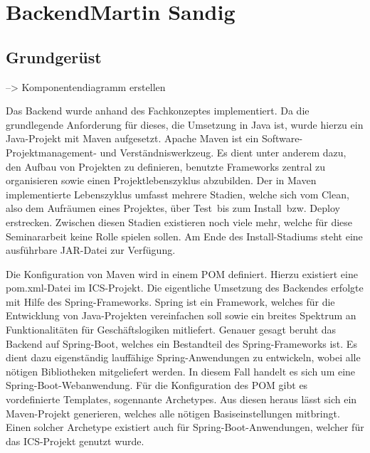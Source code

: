 	\section[Backend]{Backend{\hfill \normalsize Martin Sandig}}
\subsection{Grundgerüst}\label{umsetzung:backend:grundgeruest}
--> Komponentendiagramm erstellen



Das Backend wurde anhand des Fachkonzeptes implementiert. Da die grundlegende Anforderung für dieses, die Umsetzung in Java ist, wurde hierzu ein Java-Projekt mit Maven aufgesetzt. Apache Maven ist ein Software-Projektmanagement- und Verständniswerkzeug.\autocite{ApacheSoftwareFoundation} Es dient unter anderem dazu, den Aufbau von Projekten zu definieren, benutzte Frameworks zentral zu organisieren sowie einen Projektlebenszyklus abzubilden. Der in Maven implementierte Lebenszyklus umfasst mehrere Stadien, welche sich vom \glqq Clean\grqq, also dem Aufräumen eines Projektes, über \glqq Test\grqq \, bis zum \glqq Install\grqq \, bzw. \glqq Deploy\grqq \, erstrecken. Zwischen diesen Stadien existieren noch viele mehr, welche für diese Seminararbeit keine Rolle spielen sollen. Am Ende des \glqq Install\grqq -Stadiums steht eine ausführbare JAR-Datei zur Verfügung.

Die Konfiguration von Maven wird in einem \ac{POM} definiert. Hierzu existiert eine \glqq pom.xml\grqq-Datei im \ac{ICS}-Projekt. Die eigentliche Umsetzung des Backendes erfolgte mit Hilfe des \glqq Spring\grqq -Frameworks. Spring ist ein Framework, welches für die Entwicklung von Java-Projekten vereinfachen soll sowie ein breites Spektrum an Funktionalitäten für Geschäftslogiken mitliefert.  Genauer gesagt beruht das Backend auf \glqq Spring-Boot\grqq, welches ein Bestandteil des Spring-Frameworks ist. Es dient dazu eigenständig lauffähige Spring-Anwendungen zu entwickeln, wobei alle nötigen Bibliotheken mitgeliefert werden.\autocite{PivotalSoftwareInc} In diesem Fall handelt es sich um eine Spring-Boot-Webanwendung. Für die Konfiguration des \ac{POM} gibt es vordefinierte Templates, sogennante \glqq Archetypes\grqq. Aus diesen heraus lässt sich ein Maven-Projekt generieren, welches alle nötigen Basiseinstellungen mitbringt. Einen solcher Archetype existiert auch für Spring-Boot-Anwendungen, welcher für das \ac{ICS}-Projekt genutzt wurde.

